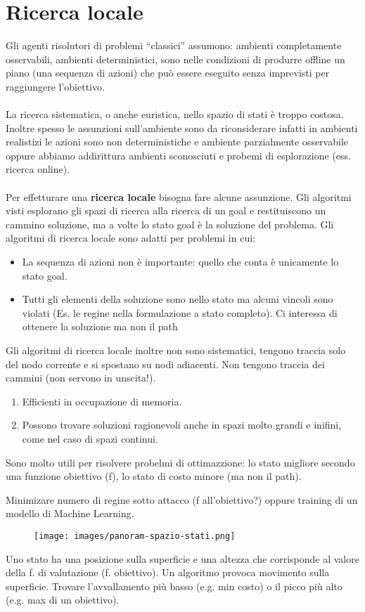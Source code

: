 \newpage
\section{Ricerca locale}
Gli agenti risolutori di problemi “classici” assumono: ambienti completamente osservabili, ambienti deterministici, sono nelle condizioni di produrre offline un piano
(una sequenza di azioni) che può essere eseguito senza imprevisti per raggiungere l’obiettivo.\\\\
La ricerca sistematica, o anche euristica, nello spazio di stati è troppo costosa. Inoltre spesso le assunzioni sull’ambiente sono da riconsiderare
infatti in ambienti realistizi le azioni sono non deterministiche e ambiente parzialmente osservabile oppure abbiamo addirittura ambienti sconosciuti e probemi di esplorazione (ess. ricerca online).\\\\
Per effetturare una \textbf{ricerca locale} bisogna fare alcune assunzione. Gli algoritmi visti esplorano gli spazi di ricerca alla ricerca di un goal e restituiscono un cammino soluzione,
ma a volte lo stato goal è la soluzione del problema. Gli algoritmi di ricerca locale sono adatti per problemi in cui:
\begin{itemize}
    \item La sequenza di azioni non è importante: quello che conta è unicamente lo stato goal.
    \item Tutti gli elementi della soluzione sono nello stato ma alcuni vincoli sono violati (Es. le regine nella formulazione a stato completo). Ci interessa di ottenere la soluzione ma non il path
\end{itemize}
Gli algoritmi di ricerca locale inoltre non sono sistematici, tengono traccia solo del nodo corrente e si spostano su nodi adiacenti. Non 
tengono traccia dei cammini (non servono in unscita!).
\begin{enumerate}
    \item Efficienti in occupazione di memoria.
    \item Possono trovare soluzioni ragionevoli anche in spazi molto grandi e inifini, come nel caso di spazi continui.
\end{enumerate}
Sono molto utili per risolvere probelmi di ottimazzione: lo stato migliore secondo una funzione obiettivo (f),
lo stato di costo minore (ma non il path).
\begin{example}
    Minimizare numero di regine sotto attacco (f all’obiettivo?) oppure training di un modello di Machine Learning.
\end{example}
\begin{figure}[h!]
    \centering
    \texttt{[image: images/panoram-spazio-stati.png]}
\end{figure}
Uno stato ha una posizione sulla superficie e una altezza che corrisponde al valore della f. di valutazione (f. obiettivo).
Un algoritmo provoca movimento sulla superficie. Trovare l’avvallamento più basso (e.g. min costo) o il picco più alto (e.g. max di un obiettivo).


